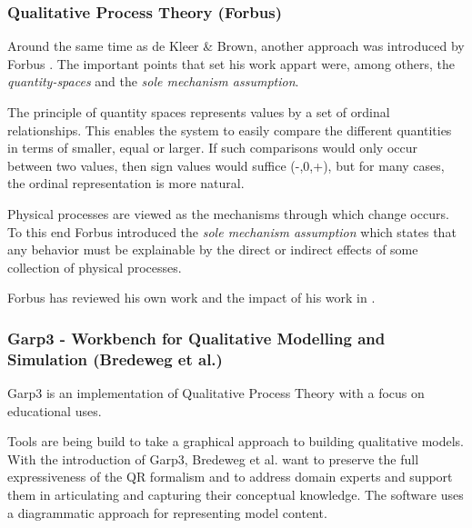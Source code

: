 \documentclass{article} %
\begin{document}
\subsubsection{Qualitative Process Theory (Forbus)}

Around the same time as de Kleer \& Brown, another approach was introduced by
Forbus \cite{forbus}. The important points that set his work appart were,
among others, the \emph{quantity-spaces} and the \emph{sole mechanism
assumption}.

The principle of quantity spaces represents values by a set of ordinal
relationships. This enables the system to easily compare the different
quantities in terms of smaller, equal or larger. If such comparisons would
only occur between two values, then sign values would suffice (-,0,+), but for
many cases, the ordinal representation is more natural.

\vspace{0.8em}

Physical processes are viewed as the mechanisms through which change occurs.
To this end Forbus introduced the \emph{sole mechanism assumption} which
states that any behavior must be explainable by the direct or indirect effects
of some collection of physical processes.

\vspace{0.8em}

Forbus has reviewed his own work and the impact of his work in
\cite{forbus12}.

\subsubsection{Garp3 - Workbench for Qualitative Modelling and Simulation
(Bredeweg et al.)}

Garp3 is an implementation of Qualitative Process Theory with a focus on
educational uses.

Tools are being build to take a graphical approach to building qualitative 
models. With the introduction of Garp3, Bredeweg et al. want to preserve the
full expressiveness of the QR formalism and to address domain experts and
support them in articulating and capturing their conceptual knowledge. The
software uses a diagrammatic approach for representing model content.
\end{document}
